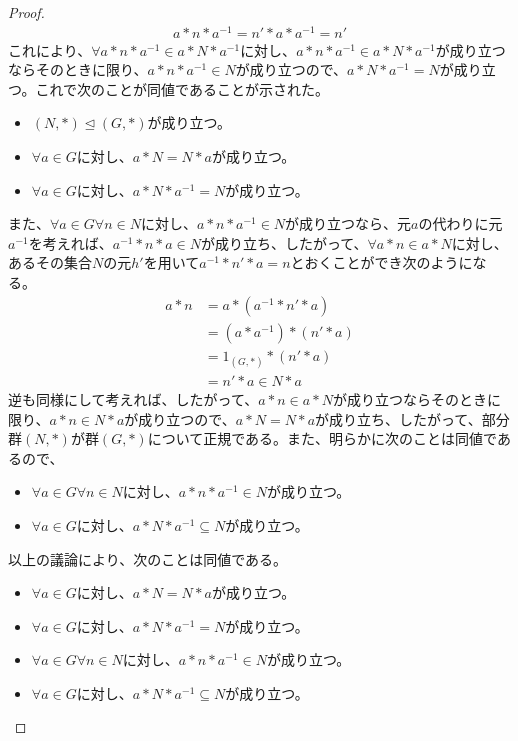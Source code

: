 \documentclass[dvipdfmx]{jsarticle}
\begin{document}
\begin{dfn}
\begin{proof}
\begin{align*}
a*n*a^{- 1} = n'*a*a^{- 1} = n'
\end{align*}
これにより、$\forall a*n*a^{- 1} \in a*N*a^{- 1}$に対し、$a*n*a^{- 1} \in a*N*a^{- 1}$が成り立つならそのときに限り、$a*n*a^{- 1} \in N$が成り立つので、$a*N*a^{- 1} = N$が成り立つ。これで次のことが同値であることが示された。
\begin{itemize}
\item
  $(N,*) \trianglelefteq (G,*)$が成り立つ。
\item
  $\forall a \in G$に対し、$a*N = N*a$が成り立つ。
\item
  $\forall a \in G$に対し、$a*N*a^{- 1} = N$が成り立つ。
\end{itemize}\par
また、$\forall a \in G\forall n \in N$に対し、$a*n*a^{- 1} \in N$が成り立つなら、元$a$の代わりに元$a^{- 1}$を考えれば、$a^{- 1}*n*a \in N$が成り立ち、したがって、$\forall a*n \in a*N$に対し、あるその集合$N$の元$h'$を用いて$a^{- 1}*n'*a = n$とおくことができ次のようになる。
\begin{align*}
a*n &= a*\left( a^{- 1}*n'*a \right)\\
&= \left( a*a^{- 1} \right)*\left( n'*a \right)\\
&= 1_{(G,*)}*\left( n'*a \right)\\
&= n'*a \in N*a
\end{align*}
逆も同様にして考えれば、したがって、$a*n \in a*N$が成り立つならそのときに限り、$a*n \in N*a$が成り立つので、$a*N = N*a$が成り立ち、したがって、部分群$(N,*)$が群$(G,*)$について正規である。また、明らかに次のことは同値であるので、
\begin{itemize}
\item
  $\forall a \in G\forall n \in N$に対し、$a*n*a^{- 1} \in N$が成り立つ。
\item
  $\forall a \in G$に対し、$a*N*a^{- 1} \subseteq N$が成り立つ。
\end{itemize}
以上の議論により、次のことは同値である。
\begin{itemize}
\item
  $\forall a \in G$に対し、$a*N = N*a$が成り立つ。
\item
  $\forall a \in G$に対し、$a*N*a^{- 1} = N$が成り立つ。
\item
  $\forall a \in G\forall n \in N$に対し、$a*n*a^{- 1} \in N$が成り立つ。
\item
  $\forall a \in G$に対し、$a*N*a^{- 1} \subseteq N$が成り立つ。
\end{itemize}
\end{proof}

\end{dfn}
\end{document}
